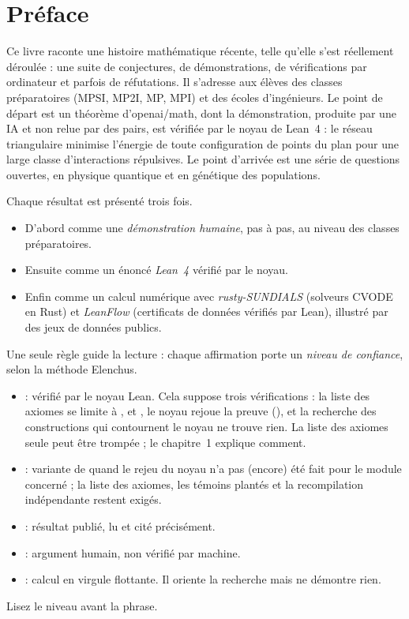 \chapter*{Préface}
Ce livre raconte une histoire mathématique récente, telle qu'elle s'est réellement déroulée : une suite de conjectures,
de démonstrations, de vérifications par ordinateur et parfois de réfutations. Il s'adresse aux élèves des classes
préparatoires (MPSI, MP2I, MP, MPI) et des écoles d'ingénieurs. Le point de départ est un théorème d'openai/math, dont la démonstration, produite par une IA et non relue par des pairs, est vérifiée par le noyau de Lean~4 : le réseau triangulaire minimise l'énergie de toute configuration de points du plan pour une large classe
d'interactions répulsives. Le point d'arrivée est une série de questions ouvertes, en physique quantique et en
génétique des populations.

Chaque résultat est présenté trois fois.
\begin{itemize}
\item D'abord comme une \emph{démonstration humaine}, pas à pas, au niveau des classes préparatoires.
\item Ensuite comme un énoncé \emph{Lean~4} vérifié par le noyau.
\item Enfin comme un calcul numérique avec \emph{rusty-SUNDIALS} (solveurs CVODE en Rust) et \emph{LeanFlow}
(certificats de données vérifiés par Lean), illustré par des jeux de données publics.
\end{itemize}

Une seule règle guide la lecture : chaque affirmation porte un \emph{niveau de confiance}, selon la méthode Elenchus.
\begin{itemize}
\item \tierA{} : vérifié par le noyau Lean. Cela suppose trois vérifications : la liste des axiomes se limite à
,  et , le noyau rejoue la preuve (), et la
recherche des constructions qui contournent le noyau ne trouve rien. La liste des axiomes seule peut être trompée ;
le chapitre~1 explique comment.
\item \tierAs{} : variante de \tierA{} quand le rejeu du noyau n'a pas (encore) été fait pour le module concerné ; la liste des axiomes, les témoins plantés et la recompilation indépendante restent exigés.
\item \tierL{} : résultat publié, lu et cité précisément.
\item \tierC{} : argument humain, non vérifié par machine.
\item \tierX{} : calcul en virgule flottante. Il oriente la recherche mais ne démontre rien.
\end{itemize}
Lisez le niveau avant la phrase.

